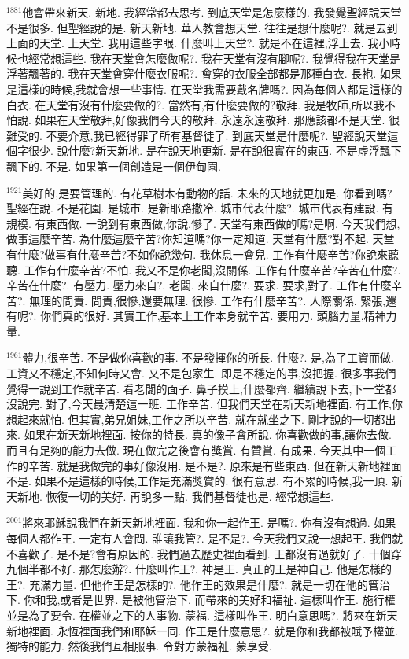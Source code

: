 \documentclass{book}
\begin{document}
$^{1881}$他會帶來新天.
新地.
我經常都去思考.
到底天堂是怎麼樣的.
我發覺聖經說天堂不是很多.
但聖經說的是.
新天新地.
華人教會想天堂.
往往是想什麼呢?.
就是去到上面的天堂.
上天堂.
我用這些字眼.
什麼叫上天堂?.
就是不在這裡,浮上去.
我小時候也經常想這些.
我在天堂會怎麼做呢?.
我在天堂有沒有腳呢?.
我覺得我在天堂是浮著飄著的.
我在天堂會穿什麼衣服呢?.
會穿的衣服全部都是那種白衣.
長袍.
如果是這樣的時候,我就會想一些事情.
在天堂我需要戴名牌嗎?.
因為每個人都是這樣的白衣.
在天堂有沒有什麼要做的?.
當然有,有什麼要做的?敬拜.
我是牧師,所以我不怕說.
如果在天堂敬拜,好像我們今天的敬拜.
永遠永遠敬拜.
那應該都不是天堂.
很難受的.
不要介意,我已經得罪了所有基督徒了.
到底天堂是什麼呢?.
聖經說天堂這個字很少.
說什麼?新天新地.
是在說天地更新.
是在說很實在的東西.
不是虛浮飄下飄下的.
不是.
如果第一個創造是一個伊甸園.

$^{1921}$美好的,是要管理的.
有花草樹木有動物的話.
未來的天地就更加是.
你看到嗎?聖經在說.
不是花園.
是城市.
是新耶路撒冷.
城市代表什麼?.
城市代表有建設.
有規模.
有東西做.
一說到有東西做,你說,慘了.
天堂有東西做的嗎?是啊.
今天我們想,做事這麼辛苦.
為什麼這麼辛苦?你知道嗎?你一定知道.
天堂有什麼?對不起.
天堂有什麼?做事有什麼辛苦?不如你說幾句.
我休息一會兒.
工作有什麼辛苦?你說來聽聽.
工作有什麼辛苦?不怕.
我又不是你老闆,沒關係.
工作有什麼辛苦?辛苦在什麼?.
辛苦在什麼?.
有壓力.
壓力來自?.
老闆.
來自什麼?.
要求.
要求,對了.
工作有什麼辛苦?.
無理的問責.
問責,很慘,還要無理.
很慘.
工作有什麼辛苦?.
人際關係.
緊張,還有呢?.
你們真的很好.
其實工作,基本上工作本身就辛苦.
要用力.
頭腦力量,精神力量.

$^{1961}$體力,很辛苦.
不是做你喜歡的事.
不是發揮你的所長.
什麼?.
是,為了工資而做.
工資又不穩定,不知何時又會.
又不是包家生.
即是不穩定的事,沒把握.
很多事我們覺得一說到工作就辛苦.
看老闆的面子.
鼻子摸上,什麼都齊.
繼續說下去,下一堂都沒說完.
對了,今天最清楚這一班.
工作辛苦.
但我們天堂在新天新地裡面.
有工作,你想起來就怕.
但其實,弟兄姐妹,工作之所以辛苦.
就在就坐之下.
剛才說的一切都出來.
如果在新天新地裡面.
按你的特長.
真的像子會所說.
你喜歡做的事,讓你去做.
而且有足夠的能力去做.
現在做完之後會有獎賞.
有贊賞.
有成果.
今天其中一個工作的辛苦.
就是我做完的事好像沒用.
是不是?.
原來是有些東西.
但在新天新地裡面不是.
如果不是這樣的時候,工作是充滿獎賞的.
很有意思.
有不累的時候,我一頂.
新天新地.
恢復一切的美好.
再說多一點.
我們基督徒也是.
經常想這些.

$^{2001}$將來耶穌說我們在新天新地裡面.
我和你一起作王.
是嗎?.
你有沒有想過.
如果每個人都作王.
一定有人會問.
誰讓我管?.
是不是?.
今天我們又說一想起王.
我們就不喜歡了.
是不是?會有原因的.
我們過去歷史裡面看到.
王都沒有過就好了.
十個穿九個半都不好.
那怎麼辦?.
什麼叫作王?.
神是王.
真正的王是神自己.
他是怎樣的王?.
充滿力量.
但他作王是怎樣的?.
他作王的效果是什麼?.
就是一切在他的管治下.
你和我,或者是世界.
是被他管治下.
而帶來的美好和福祉.
這樣叫作王.
施行權並是為了要令.
在權並之下的人事物.
蒙福.
這樣叫作王.
明白意思嗎?.
將來在新天新地裡面.
永恆裡面我們和耶穌一同.
作王是什麼意思?.
就是你和我都被賦予權並.
獨特的能力.
然後我們互相服事.
令對方蒙福祉.
蒙享受.
\end{document}
